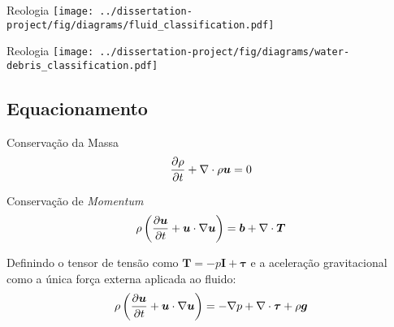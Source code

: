 \begin{frame}{Reologia}
    \texttt{[image: ../dissertation-project/fig/diagrams/fluid\_classification.pdf]}
\end{frame}

\begin{frame}{Reologia}
    \centering
    \texttt{[image: ../dissertation-project/fig/diagrams/water-debris\_classification.pdf]}
\end{frame}

\subsection{Equacionamento}
\begin{frame}
    \begin{exampleblock}{Conservação da Massa}
        \begin{equation}
            \frac{\partial \rho}{\partial t} + \nabla \cdot \rho \bm{u} = 0
        \end{equation}
    \end{exampleblock}

    \begin{exampleblock}{Conservação de \textit{Momentum}}
        \begin{equation}
            \rho \left( \frac{\partial \bm{u}}{\partial t}  + \bm{u} \cdot \nabla \bm{u} \right) =
            \bm{b} + \nabla \cdot \bm{T}
        \end{equation}
    \end{exampleblock}

    \hspace{0.5cm} Definindo o tensor de tensão como $\bm{T} = -p\bm{I} + \bm{\tau}$ e a 
    aceleração gravitacional como a única força externa aplicada ao fluido:
        \vspace{0.25cm}
        \begin{equation}
            \rho \left( \frac{\partial \bm{u}}{\partial t}  + \bm{u} \cdot \nabla \bm{u} \right) =
            -\nabla p + \nabla \cdot \bm{\tau} + \rho \bm{g}
        \end{equation}
\end{frame}

